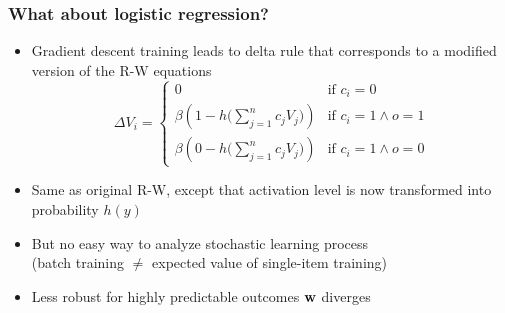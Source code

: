 \begin{frame}
  \frametitle{What about logistic regression?}

  \begin{itemize}
  \item Gradient descent training leads to delta rule that corresponds to a modified version of the R-W equations
    \[
    \Delta V_i =
    \begin{cases}
      0 & \text{if } c_i = 0\\
      \beta \left( 1 - h \bigl( \sum_{j=1}^n c_j V_j \bigr) \right) & \text{if } c_i = 1 \wedge o = 1 \\
      \beta \left( 0 - h \bigl( \sum_{j=1}^n c_j V_j \bigr) \right) & \text{if } c_i = 1 \wedge o = 0
    \end{cases}
    \]
  \item<2-> Same as original R-W, except that activation level is now transformed into probability $h(y)$
  \item<2-> But no easy way to analyze stochastic learning process\\
    (batch training $\neq$ expected value of single-item training)
  \item<2-> Less robust for highly predictable outcomes \so $\vw$ diverges
  \end{itemize}
\end{frame}

